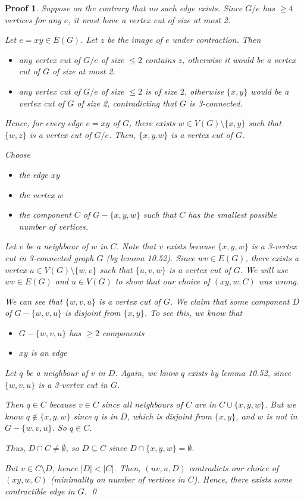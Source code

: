 \documentclass[twoside]{article}
\newtheorem{protoproof}[prototheorem]{Proof}
\renewenvironment{proof}
{\colorlet{shadecolor}{blue!15}\begin{shaded}\begin{protoproof}
		\normalfont}
		{\qed\end{protoproof}\end{shaded}}
\begin{document}
\begin{proof}
	Suppose on the contrary that no such edge exists. Since $G / e$ has $\geq 4$ vertices for any $e$, it must have a vertex cut of size at most 2. 
			
	Let $e = xy \in E(G)$. Let $z$ be the image of $e$ under contraction. Then \begin{itemize}
	\item any vertex cut of $G / e$ of size $\leq 2$ contains $z$, otherwise it would be a vertex cut of $G$ of size at most 2. 
	\item any vertex cut of $G / e$ of size $\leq 2$ is of size $2$, otherwise $\{x, y\}$ would be a vertex cut of $G$ of size 2, contradicting that $G$ is 3-connected. 
	\end{itemize}
	Hence, for every edge $e = xy$ of $G$, there exists $w \in V(G) \setminus \{x, y\}$ such that $\{w,z \}$ is a vertex cut of $G / e$. Then, $\{x, y. w\}$ is a vertex cut of $G$. 
		
	Choose \begin{itemize}
	\item the edge $xy$
	\item the vertex $w$
	\item the component $C$ of $G - \{x, y, w\}$ such that $C$ has the smallest possible number of vertices. 
	\end{itemize}
		
	Let $v$ be a neighbour of $w$ in $C$. Note that $v$ exists because $\{x, y, w\}$ is a 3-vertex cut in 3-connected graph $G$ (by lemma 10.52). Since $wv \in E(G)$, there exists a vertex $u \in V(G) \setminus \{w, v\}$ such that $\{u, v, w\}$ is a vertex cut of $G$. We will use $wv \in E(G)$ and $u \in V(G)$ to show that our choice of $(xy, w, C)$ was wrong. 
		
	We can see that $\{w, v, u\}$ is a vertex cut of $G$. We claim that some component $D$ of $G - \{w, v, u\}$ is disjoint from $\{x, y\}$. To see this, we know that \begin{itemize}
	\item $G - \{w, v, u\}$ has $\geq 2$ components
	\item $xy$ is an edge
	\end{itemize}
	Let $q$ be a neighbour of $v$ in $D$. Again, we know $q$ exists by lemma 10.52, since $\{w, v, u\}$ is a 3-vertex cut in $G$. 
		
	Then $q \in C$ because $v \in C$ since all neighbours of $C$ are in $C \cup \{x, y, w\}$. But we know $q \notin \{x, y, w\}$ since $q$ is in $D$, which is disjoint from $\{x, y\}$, and $w$ is not in $G - \{w, v, u\}$. So $q \in C$.
		
	Thus, $D \cap C \neq \emptyset$, so $D \subseteq C$ since $D \cap \{x, y, w\} = \emptyset$. 
		
	But $v \in C \setminus D$, hence $|D| < |C|$. Then, $(uv, u, D)$ contradicts our choice of $(xy, w, C)$ (minimality on number of vertices in $C$). Hence, there exists some contractible edge in $G$. 
\end{proof}
\end{document}
